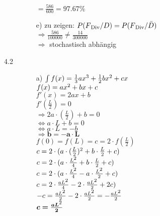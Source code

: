 \documentclass[a4paper]{article}
\begin{document}
\begin{description}
\begin{itemize}
									$=\frac{586}{600}= 97.67\%$\\
									
				\item[e)] zu zeigen: $P(F\textsubscript{Div}/D) = P(F\textsubscript{Div}/\bar{D})$\\
				
									$\Rightarrow \frac{586}{100000} \neq \frac{14}{300000}$\\
									
									$\Rightarrow$ stochastisch abhängig 
				\end{itemize}

\item[4.2] 
				
			\begin{itemize}
				\item[a)] $\int f(x)=\frac{1}{3}ax\textsuperscript{3}+\frac{1}{2}bx\textsuperscript{2}+cx$\\
									$f(x)=ax\textsuperscript{2}+bx+c$\\
									$f'(x)=2ax+b$\\
									
									$f'(\frac{L}{2})=0$\\
									$\Rightarrow 2a\cdot (\frac{L}{2})+b=0$\\
									$\Leftrightarrow a\cdot L +b =0$\\
									$\Leftrightarrow a\cdot L = -b$\\
									$\Rightarrow \boldsymbol{b= -a\cdot L}$\\
									
									$f(0)=f(L)=c=2\cdot f(\frac{L}{2})$\\
									$c= 2\cdot (a\cdot (\frac{L}{2})\textsuperscript{2}+ b\cdot \frac{L}{2}+c)$\\
									$c= 2\cdot (a\cdot \frac{L\textsuperscript{2}}{4}+ b\cdot \frac{L}{2}+c)$\\
									$c= 2\cdot (a\cdot \frac{L\textsuperscript{2}}{4}- a \cdot \frac{L\textsuperscript{2}}{2}+c)$\\
									$c= 2\cdot \frac{aL\textsuperscript{2}}{4}- 2 \cdot \frac{aL\textsuperscript{2}}{2}+2c)$\\
									$-c=\frac{aL\textsuperscript{2}}{2}-2\cdot \frac{aL\textsuperscript{2}}{2}= -	\frac{aL\textsuperscript{2}}{2}$\\
										
									$\boldsymbol{c=\frac{aL\textsuperscript{2}}{2}}$\\
									

\end{itemize}
\end{description}
\end{document}
